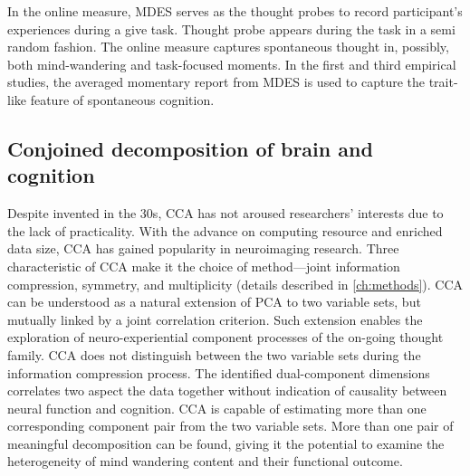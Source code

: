 In the online measure, MDES serves as the thought probes to record participant's experiences during a give task. Thought probe appears during the task in a semi random fashion. The online measure captures spontaneous thought in, possibly, both mind-wandering and task-focused moments. In the first and third empirical studies, the averaged momentary report from MDES is used to capture the trait-like feature of spontaneous cognition.


\subsection{Conjoined decomposition of brain and cognition}

Despite invented in the 30s, CCA has not aroused researchers’ interests due to the lack of practicality. With the advance on computing resource and enriched data size, CCA has gained popularity in neuroimaging research. Three characteristic of CCA make it the choice of method---joint information compression, symmetry, and multiplicity (details described in \cref{ch:methods}). CCA can be understood as a natural extension of PCA to two variable sets, but mutually linked by a joint correlation criterion. Such extension enables the exploration of neuro-experiential component processes of the on-going thought family. CCA does not distinguish between the two variable sets during the information compression process. The identified dual-component dimensions correlates two aspect the data together without indication of causality between neural function and cognition. CCA is capable of estimating more than one corresponding component pair from the two variable sets. More than one pair of meaningful decomposition can be found, giving it the potential to examine the heterogeneity of mind wandering content and their functional outcome. 

